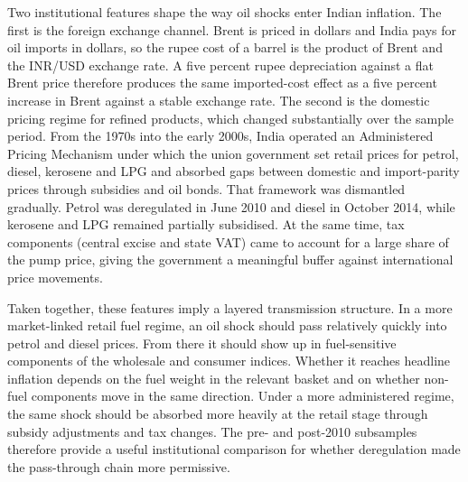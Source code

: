 \documentclass[11pt,a4paper]{article}
\begin{document}
Two institutional features shape the way oil shocks enter Indian inflation. The first is the foreign exchange channel. Brent is priced in dollars and India pays for oil imports in dollars, so the rupee cost of a barrel is the product of Brent and the INR/USD exchange rate. A five percent rupee depreciation against a flat Brent price therefore produces the same imported-cost effect as a five percent increase in Brent against a stable exchange rate. The second is the domestic pricing regime for refined products, which changed substantially over the sample period. From the 1970s into the early 2000s, India operated an Administered Pricing Mechanism under which the union government set retail prices for petrol, diesel, kerosene and LPG and absorbed gaps between domestic and import-parity prices through subsidies and oil bonds. That framework was dismantled gradually. Petrol was deregulated in June 2010 and diesel in October 2014, while kerosene and LPG remained partially subsidised. At the same time, tax components (central excise and state VAT) came to account for a large share of the pump price, giving the government a meaningful buffer against international price movements.

Taken together, these features imply a layered transmission structure. In a more market-linked retail fuel regime, an oil shock should pass relatively quickly into petrol and diesel prices. From there it should show up in fuel-sensitive components of the wholesale and consumer indices. Whether it reaches headline inflation depends on the fuel weight in the relevant basket and on whether non-fuel components move in the same direction. Under a more administered regime, the same shock should be absorbed more heavily at the retail stage through subsidy adjustments and tax changes. The pre- and post-2010 subsamples therefore provide a useful institutional comparison for whether deregulation made the pass-through chain more permissive.
\end{document}
